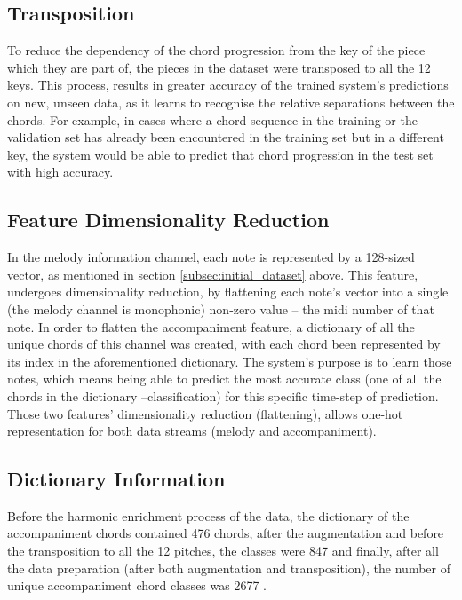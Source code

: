         \subsection{Transposition}
        To reduce the dependency of the chord progression from the key of the piece which they are part of, the pieces in the dataset were transposed to all the 12 keys. This process, results in greater accuracy of the trained system's predictions on new, unseen data, as it learns to recognise the relative separations between the chords. For example, in cases where a chord sequence in the training or the validation set has already been encountered in the training set but in a different key, the system would be able to predict that chord progression in the test set with high accuracy.
            
        \subsection{Feature Dimensionality Reduction}
        In the melody information channel, each note is represented by a 128-sized vector, as mentioned in section \ref{subsec:initial_dataset} above. This feature, undergoes dimensionality reduction, by flattening each note's vector into a single (the melody channel is monophonic) non-zero value – the midi number of that note. In order to flatten the accompaniment feature, a dictionary of all the unique chords of this channel was created, with each chord been represented by its index in the aforementioned dictionary. The system's purpose is to learn those notes, which means being able to predict the most accurate class (one of all the chords in the dictionary --classification) for this specific time-step of prediction. Those two features' dimensionality reduction (flattening), allows one-hot representation for both data streams (melody and accompaniment). 
        
        
        \subsection{Dictionary Information} \label{subsec:dict_info}
        Before the harmonic enrichment process of the data, the dictionary of the accompaniment chords contained 476 chords, after the augmentation and before the transposition to all the 12 pitches, the classes were 847 and finally, after all the data preparation (after both augmentation and transposition), the number of unique accompaniment chord classes was 2677 .

